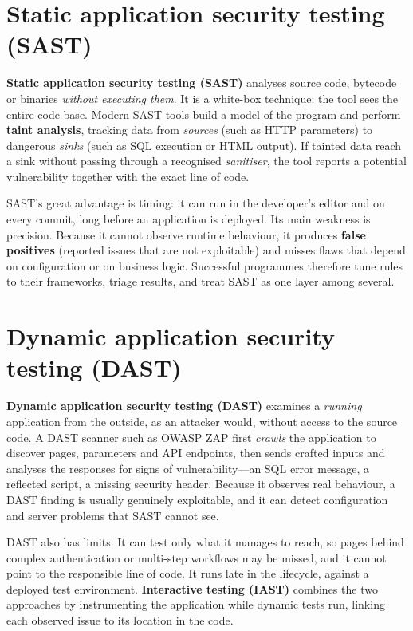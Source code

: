 \documentclass[11pt,openany]{book}
\begin{document}
\section{Static application security testing (SAST)}\label{sec:10.1}
\textbf{Static application security testing (SAST)} analyses source code, bytecode or binaries \emph{without executing them}. It is a white-box technique: the tool sees the entire code base. Modern SAST tools build a model of the program and perform \textbf{taint analysis}, tracking data from \emph{sources} (such as HTTP parameters) to dangerous \emph{sinks} (such as SQL execution or HTML output). If tainted data reach a sink without passing through a recognised \emph{sanitiser}, the tool reports a potential vulnerability together with the exact line of code.

SAST's great advantage is timing: it can run in the developer's editor and on every commit, long before an application is deployed. Its main weakness is precision. Because it cannot observe runtime behaviour, it produces \textbf{false positives} (reported issues that are not exploitable) and misses flaws that depend on configuration or on business logic. Successful programmes therefore tune rules to their frameworks, triage results, and treat SAST as one layer among several.

\section{Dynamic application security testing (DAST)}\label{sec:10.2}
\textbf{Dynamic application security testing (DAST)} examines a \emph{running} application from the outside, as an attacker would, without access to the source code. A DAST scanner such as OWASP ZAP first \emph{crawls} the application to discover pages, parameters and API endpoints, then sends crafted inputs and analyses the responses for signs of vulnerability—an SQL error message, a reflected script, a missing security header. Because it observes real behaviour, a DAST finding is usually genuinely exploitable, and it can detect configuration and server problems that SAST cannot see.

DAST also has limits. It can test only what it manages to reach, so pages behind complex authentication or multi-step workflows may be missed, and it cannot point to the responsible line of code. It runs late in the lifecycle, against a deployed test environment. \textbf{Interactive testing (IAST)} combines the two approaches by instrumenting the application while dynamic tests run, linking each observed issue to its location in the code.
\end{document}
